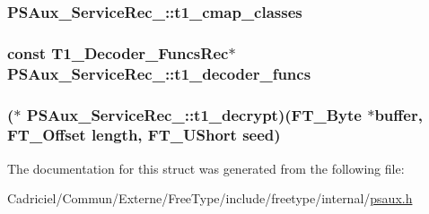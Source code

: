 \hypertarget{struct_p_s_aux___service_rec___a4ac30b929dcc6127200baea07b5b406a}{
\subsubsection[{t1\-\_\-cmap\-\_\-classes}]{ P\-S\-Aux\-\_\-\-Service\-Rec\-\_\-\-::t1\-\_\-cmap\-\_\-classes}}\label{struct_p_s_aux___service_rec___a4ac30b929dcc6127200baea07b5b406a}
\hypertarget{struct_p_s_aux___service_rec___a5cfe03f55fa4c342a094fd31355835b2}{
\subsubsection[{t1\-\_\-decoder\-\_\-funcs}]{\setlength{\rightskip}{0pt plus 5cm}const {\bf T1\-\_\-\-Decoder\-\_\-\-Funcs\-Rec}$\ast$ P\-S\-Aux\-\_\-\-Service\-Rec\-\_\-\-::t1\-\_\-decoder\-\_\-funcs}}\label{struct_p_s_aux___service_rec___a5cfe03f55fa4c342a094fd31355835b2}
\hypertarget{struct_p_s_aux___service_rec___a908d3ea91a5c313015bc90568026d57c}{
\subsubsection[{t1\-\_\-decrypt}]{($\ast$ P\-S\-Aux\-\_\-\-Service\-Rec\-\_\-\-::t1\-\_\-decrypt)({\bf F\-T\-\_\-\-Byte} $\ast${\bf buffer}, {\bf F\-T\-\_\-\-Offset} {\bf length}, {\bf F\-T\-\_\-\-U\-Short} seed)}}\label{struct_p_s_aux___service_rec___a908d3ea91a5c313015bc90568026d57c}


The documentation for this struct was generated from the following file\-:\begin{DoxyCompactItemize}
\item 
Cadriciel/\-Commun/\-Externe/\-Free\-Type/include/freetype/internal/\hyperlink{psaux_8h}{psaux.\-h}\end{DoxyCompactItemize}
